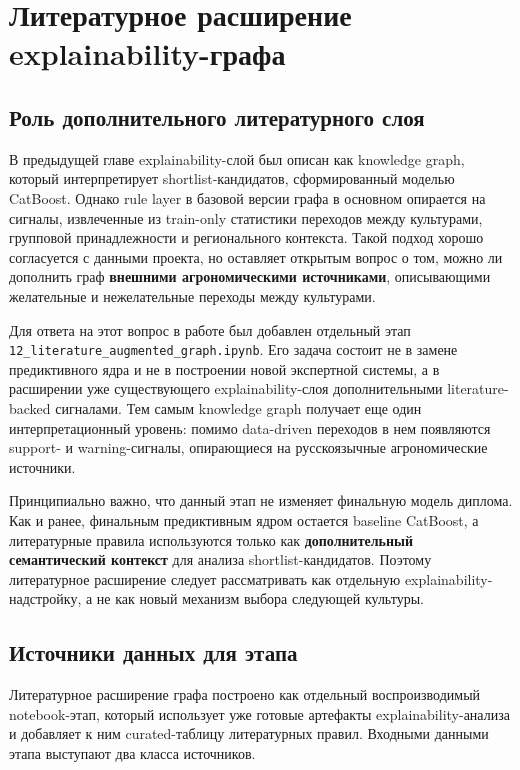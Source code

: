 \section{Литературное расширение explainability-графа}

\subsection{Роль дополнительного литературного слоя}

В предыдущей главе explainability-слой был описан как knowledge graph, который интерпретирует shortlist-кандидатов, сформированный моделью CatBoost. Однако rule layer в базовой версии графа в основном опирается на сигналы, извлеченные из train-only статистики переходов между культурами, групповой принадлежности и регионального контекста. Такой подход хорошо согласуется с данными проекта, но оставляет открытым вопрос о том, можно ли дополнить граф \textbf{внешними агрономическими источниками}, описывающими желательные и нежелательные переходы между культурами.

Для ответа на этот вопрос в работе был добавлен отдельный этап \texttt{12\_literature\_augmented\_graph.ipynb}. Его задача состоит не в замене предиктивного ядра и не в построении новой экспертной системы, а в расширении уже существующего explainability-слоя дополнительными literature-backed сигналами. Тем самым knowledge graph получает еще один интерпретационный уровень: помимо data-driven переходов в нем появляются support- и warning-сигналы, опирающиеся на русскоязычные агрономические источники.

Принципиально важно, что данный этап не изменяет финальную модель диплома. Как и ранее, финальным предиктивным ядром остается baseline CatBoost, а литературные правила используются только как \textbf{дополнительный семантический контекст} для анализа shortlist-кандидатов. Поэтому литературное расширение следует рассматривать как отдельную explainability-надстройку, а не как новый механизм выбора следующей культуры.

\subsection{Источники данных для этапа}

Литературное расширение графа построено как отдельный воспроизводимый notebook-этап, который использует уже готовые артефакты explainability-анализа и добавляет к ним curated-таблицу литературных правил. Входными данными этапа выступают два класса источников.

